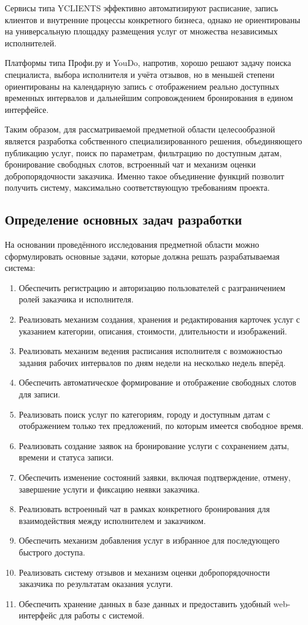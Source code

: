 Сервисы типа YCLIENTS эффективно автоматизируют расписание, запись клиентов и внутренние процессы конкретного бизнеса, однако не ориентированы на универсальную площадку размещения услуг от множества независимых исполнителей.

Платформы типа Профи.ру и YouDo, напротив, хорошо решают задачу поиска специалиста, выбора исполнителя и учёта отзывов, но в меньшей степени ориентированы на календарную запись с отображением реально доступных временных интервалов и дальнейшим сопровождением бронирования в едином интерфейсе.

Таким образом, для рассматриваемой предметной области целесообразной является разработка собственного специализированного решения, объединяющего публикацию услуг, поиск по параметрам, фильтрацию по доступным датам, бронирование свободных слотов, встроенный чат и механизм оценки добропорядочности заказчика. Именно такое объединение функций позволит получить систему, максимально соответствующую требованиям проекта.

\subsection{Определение основных задач разработки}

На основании проведённого исследования предметной области можно сформулировать основные задачи, которые должна решать разрабатываемая система:

\begin{enumerate}
	\item Обеспечить регистрацию и авторизацию пользователей с разграничением ролей заказчика и исполнителя.
	\item Реализовать механизм создания, хранения и редактирования карточек услуг с указанием категории, описания, стоимости, длительности и изображений.
	\item Реализовать механизм ведения расписания исполнителя с возможностью задания рабочих интервалов по дням недели на несколько недель вперёд.
	\item Обеспечить автоматическое формирование и отображение свободных слотов для записи.
	\item Реализовать поиск услуг по категориям, городу и доступным датам с отображением только тех предложений, по которым имеется свободное время.
	\item Реализовать создание заявок на бронирование услуги с сохранением даты, времени и статуса записи.
	\item Обеспечить изменение состояний заявки, включая подтверждение, отмену, завершение услуги и фиксацию неявки заказчика.
	\item Реализовать встроенный чат в рамках конкретного бронирования для взаимодействия между исполнителем и заказчиком.
	\item Обеспечить механизм добавления услуг в избранное для последующего быстрого доступа.
	\item Реализовать систему отзывов и механизм оценки добропорядочности заказчика по результатам оказания услуги.
	\item Обеспечить хранение данных в базе данных и предоставить удобный web-интерфейс для работы с системой.
\end{enumerate}